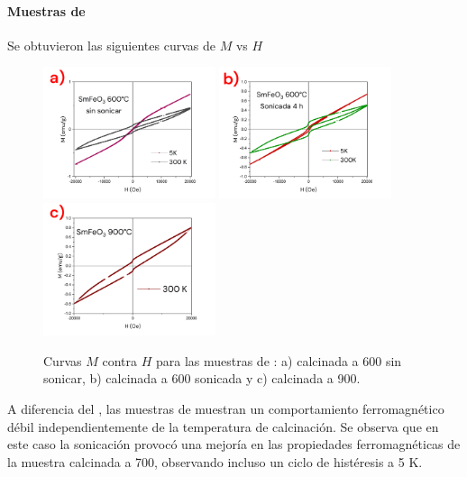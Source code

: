 \documentclass[../main.tex]{subfiles}
\begin{document}
\paragraph{Muestras de \sama{}}
Se obtuvieron las siguientes curvas de $M$ vs $H$
\begin{figure}[H]
    \centering
    \includegraphics[width=0.45\textwidth]{fig/mvhSm.png}
    \quad
    \includegraphics[width=0.45\textwidth]{fig/mvhSm-S.png}
    \includegraphics[width=0.45\textwidth]{fig/mvhSm900.png}
    \caption{Curvas $M$ contra $H$ para las muestras de \sama{}: a) calcinada a 600\gradoC{} sin sonicar, b) calcinada a 600\gradoC{} sonicada y c) calcinada a 900\gradoC{}.}
    \label{fig:mvhSm}
\end{figure}
A diferencia del \neod{}, las muestras de \sama{} muestran un comportamiento ferromagnético débil independientemente de la temperatura de calcinación. Se observa que en este caso la sonicación provocó una mejoría en las propiedades ferromagnéticas de la muestra calcinada a 700\gradoC{}, observando incluso un ciclo de histéresis a 5 K.
\end{document}
